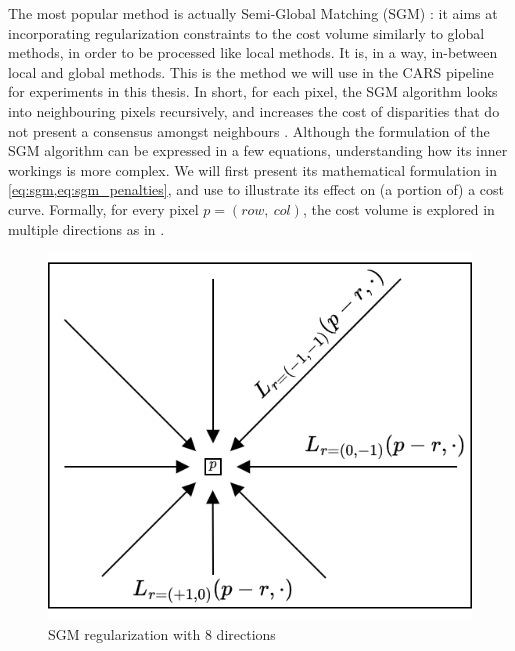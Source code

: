 The most popular method is actually Semi-Global Matching (SGM) \cite{hirschmuller_accurate_2005}: it aims at incorporating regularization constraints to the cost volume similarly to global methods, in order to be processed like local methods. It is, in a way, in-between local and global methods. This is the method we will use in the CARS pipeline for experiments in this thesis. In short, for each pixel, the SGM algorithm looks into neighbouring pixels recursively, and increases the cost of disparities that do not present a consensus amongst neighbours . Although the formulation of the SGM algorithm can be expressed in a few equations, understanding how its inner workings is more complex. We will first present its mathematical formulation in \cref{eq:sgm,eq:sgm_penalties}, and use  to illustrate its effect on (a portion of) a cost curve. Formally, for every pixel $p=(row, ~col)$, the cost volume is explored in multiple directions as in .

\begin{figure}
	\centering
	\includegraphics[width=0.5\linewidth]{Images/Chap_1/SGM_directions.png}
	\caption{SGM regularization with $8$ directions}
	\label{fig:sgm_directions}
\end{figure}

